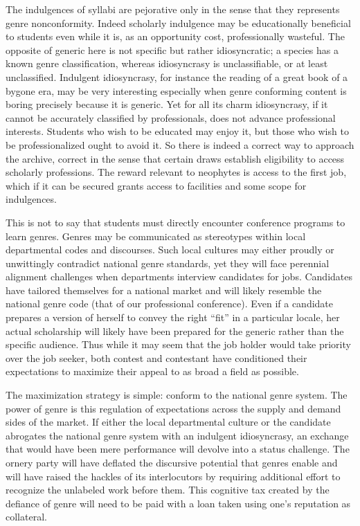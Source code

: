 \documentclass[]{book}
\theoremstyle{definition}
\theoremstyle{definition}
\theoremstyle{definition}
\theoremstyle{remark}
\begin{document}
The indulgences of syllabi are pejorative only in the sense that they
represents genre nonconformity. Indeed scholarly indulgence may be
educationally beneficial to students even while it is, as an opportunity
cost, professionally wasteful. The opposite of generic here is not
specific but rather idiosyncratic; a species has a known genre
classification, whereas idiosyncrasy is unclassifiable, or at least
unclassified. Indulgent idiosyncrasy, for instance the reading of a
great book of a bygone era, may be very interesting especially when
genre conforming content is boring precisely because it is generic. Yet
for all its charm idiosyncrasy, if it cannot be accurately classified by
professionals, does not advance professional interests. Students who
wish to be educated may enjoy it, but those who wish to be
professionalized ought to avoid it. So there is indeed a correct way to
approach the archive, correct in the sense that certain draws establish
eligibility to access scholarly professions. The reward relevant to
neophytes is access to the first job, which if it can be secured grants
access to facilities and some scope for indulgences.

This is not to say that students must directly encounter conference
programs to learn genres. Genres may be communicated as stereotypes
within local departmental codes and discourses. Such local cultures may
either proudly or unwittingly contradict national genre standards, yet
they will face perennial alignment challenges when departments interview
candidates for jobs. Candidates have tailored themselves for a national
market and will likely resemble the national genre code (that of our
professional conference). Even if a candidate prepares a version of
herself to convey the right ``fit'' in a particular locale, her actual
scholarship will likely have been prepared for the generic rather than
the specific audience. Thus while it may seem that the job holder would
take priority over the job seeker, both contest and contestant have
conditioned their expectations to maximize their appeal to as broad a
field as possible.

The maximization strategy is simple: conform to the national genre
system. The power of genre is this regulation of expectations across the
supply and demand sides of the market. If either the local departmental
culture or the candidate abrogates the national genre system with an
indulgent idiosyncrasy, an exchange that would have been mere
performance will devolve into a status challenge. The ornery party will
have deflated the discursive potential that genres enable and will have
raised the hackles of its interlocutors by requiring additional effort
to recognize the unlabeled work before them. This cognitive tax created
by the defiance of genre will need to be paid with a loan taken using
one's reputation as collateral.
\end{document}
